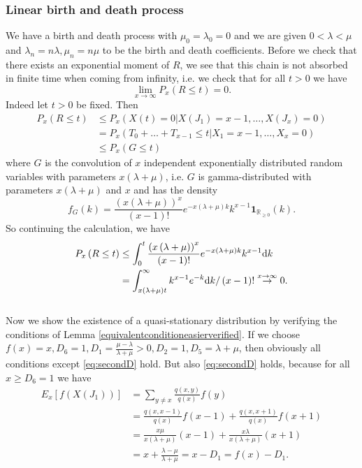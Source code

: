 \documentclass[12pt,a4paper]{scrartcl}
\numberwithin{equation}{section}
\newcommand{\R}{\mathbb{R}} %
\begin{document}
\subsubsection{Linear birth and death process}
We have a birth and death process with $\mu_0 = \lambda_0 = 0$ and we are given $ 0 < \lambda < \mu $ and $ \lambda_n = n \lambda, \mu_n = n \mu $ to be the birth and death coefficients.
Before we check that there exists an exponential moment of $R$, we see that this chain is not absorbed in finite time when coming from infinity, i.e. we check that for all $t > 0$ we have $$ \lim_{x \to \infty} P_x\left(R \leq t \right) = 0. $$
Indeed let $t > 0$ be fixed. Then
\begin{align*}
P_x\left(R \leq t \right) &\leq P_x\left(X\left(t\right) = 0 | X\left(J_1 \right) = x-1, \ldots, X\left(J_x \right) = 0 \right) \\
&= P_x\left(T_0 + \ldots + T_{x-1} \leq t | X_1 = x-1, \ldots, X_x = 0 \right) \\
&\leq P_x\left(G \leq t \right)
\end{align*}
where $G$ is the convolution of $x$ independent exponentially distributed random variables with parameters $x\left(\lambda + \mu \right)$, i.e. $G$ is gamma-distributed with parameters $x\left(\lambda + \mu \right)$ and $x$ and has the density
$$ f_G\left(k\right) = \frac{\left(x\left(\lambda + \mu \right) \right)^x }{\left(x-1 \right)!} e^{- x \left(\lambda + \mu \right) k  } k^{x-1} \textbf{1}_{\R_{\geq 0}} \left(k\right).$$
So continuing the calculation, we have
\begin{align*}
P_x\left(R \leq t \right) &\leq \int_0^t   \frac{\left(x\left(\lambda + \mu \right) \right)^x }{\left(x-1 \right)!} e^{- x \left(\lambda + \mu \right) k  } k^{x-1} \textnormal{d}k\\
&= \int_{x\left(\lambda + \mu \right)t}^{\infty} k^{x-1} e^{-k} \textnormal{d}k /\left(x-1 \right)! \overset{x \to \infty}{\to} 0.
\end{align*}\\

Now we show the existence of a quasi-stationary distribution by verifying the conditions of Lemma \ref{equivalentconditioneasierverified}. If we choose $f\left(x\right) = x, D_6 = 1, D_1 = \frac{\mu - \lambda}{\lambda + \mu} > 0, D_2 = 1, D_5 = \lambda + \mu$, then obviously all conditions except \eqref{eq:secondD} hold. But also \eqref{eq:secondD} holds, because for all $ x \geq D_6 = 1 $ we have
\begin{align*}
E_x\left[f\left(X\left(J_1\right) \right)\right] &= \sum_{y\neq x} \frac{q\left(x,y\right)}{q\left(x\right)} f\left(y\right) \\
&= \frac{q\left(x,x-1\right)}{q\left(x\right)} f\left(x-1\right) + \frac{q\left(x,x+1\right)}{q\left(x\right)} f\left(x+1\right) \\
&= \frac{x \mu}{x \left(\lambda + \mu \right) } \left(x-1\right) + \frac{x \lambda }{x\left(\lambda + \mu \right)} \left(x+1\right) \\
&= x + \frac{\lambda - \mu}{\lambda + \mu} = x - D_1 = f\left(x\right) - D_1.
\end{align*}
\end{document}
